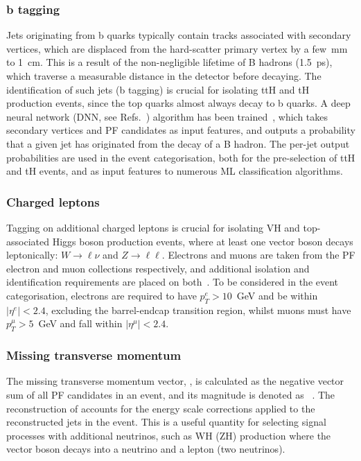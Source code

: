 \subsubsection{b tagging}
Jets originating from b quarks typically contain tracks associated with secondary vertices, which are displaced from the hard-scatter primary vertex by a few~mm to 1~cm. This is a result of the non-negligible lifetime of B hadrons (1.5~ps), which traverse a measurable distance in the detector before decaying. The identification of such jets (b tagging) is crucial for isolating ttH and tH production events, since the top quarks almost always decay to b quarks. A deep neural network (DNN, see Refs.~\cite{hastie01statisticallearning,10.5555/3086952,bishop:2006:PRML}) algorithm has been trained~\cite{Sirunyan:2017ezt}, which takes secondary vertices and PF candidates as input features, and outputs a probability that a given jet has originated from the decay of a B hadron. The per-jet output probabilities are used in the event categorisation, both for the pre-selection of ttH and tH events, and as input features to numerous ML classification algorithms.

\subsubsection{Charged leptons}
Tagging on additional charged leptons is crucial for isolating VH and top-associated Higgs boson production events, where at least one vector boson decays leptonically: $W\rightarrow\ell\nu$ and $Z\rightarrow\ell\ell$. Electrons and muons are taken from the PF electron and muon collections respectively, and additional isolation and identification requirements are placed on both~\cite{Khachatryan:2015hwa,Sirunyan:2018fpa}. To be considered in the event categorisation, electrons are required to have $p_T^e>10$~GeV and be within $|\eta^e|<2.4$, excluding the barrel-endcap transition region, whilst muons must have $p_T^\mu>5$~GeV and fall within $|\eta^\mu|<2.4$.

\subsubsection{Missing transverse momentum}
The missing transverse momentum vector, \metv, is calculated as the negative vector \pt sum of all PF candidates in an event, and its magnitude is denoted as \met~\cite{Sirunyan:2019kia}. The reconstruction of \metv accounts for the energy scale corrections applied to the reconstructed jets in the event. This is a useful quantity for selecting signal processes with additional neutrinos, such as WH (ZH) production where the vector boson decays into a neutrino and a lepton (two neutrinos).

